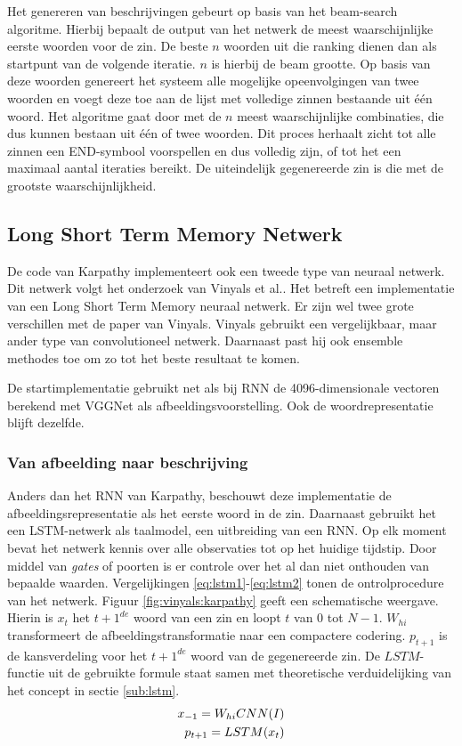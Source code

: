 Het genereren van beschrijvingen gebeurt op basis van het beam-search algoritme. Hierbij bepaalt de output van het netwerk de meest waarschijnlijke eerste woorden voor de zin. De beste $n$ woorden uit die ranking dienen dan als startpunt van de volgende iteratie. $n$ is hierbij de beam grootte. Op basis van deze woorden genereert het systeem alle mogelijke opeenvolgingen van twee woorden en voegt deze toe aan de lijst met volledige zinnen bestaande uit \'e\'en woord. Het algoritme gaat door met de $n$ meest waarschijnlijke combinaties, die dus kunnen bestaan uit \'e\'en of twee woorden. Dit proces herhaalt zicht tot alle zinnen een END-symbool voorspellen en dus volledig zijn, of tot het een maximaal aantal iteraties bereikt. De uiteindelijk gegenereerde zin is die met de grootste waarschijnlijkheid.

\subsection{Long Short Term Memory Netwerk}
\label{sec:lstm}
De code van Karpathy implementeert ook een tweede type van neuraal netwerk. Dit netwerk volgt het onderzoek van Vinyals et al.\cite{Google}. Het betreft een implementatie van een Long Short Term Memory neuraal netwerk. Er zijn wel twee grote verschillen met de paper van Vinyals. Vinyals gebruikt een vergelijkbaar, maar ander type van convolutioneel netwerk. Daarnaast past hij ook ensemble methodes toe om zo tot het beste resultaat te komen.

De startimplementatie gebruikt net als bij RNN de 4096-dimensionale vectoren berekend met VGGNet als afbeeldingsvoorstelling. Ook de woordrepresentatie blijft dezelfde.

\subsubsection{Van afbeelding naar beschrijving}
Anders dan het RNN van Karpathy, beschouwt deze implementatie de afbeeldingsrepresentatie als het eerste woord in de zin. Daarnaast gebruikt het een LSTM-netwerk als taalmodel, een uitbreiding van een RNN. Op elk moment bevat het netwerk kennis over alle observaties tot op het huidige tijdstip. Door middel van \emph{gates} of poorten is er controle over het al dan niet onthouden van bepaalde waarden. Vergelijkingen \eqref{eq:lstm1}-\eqref{eq:lstm2} tonen de ontrolprocedure van het netwerk. Figuur \ref{fig:vinyals:karpathy} geeft een schematische weergave. Hierin is $x_t$ het $t+1^{de}$ woord van een zin en loopt $t$ van $0$ tot $N-1$. $W_{hi}$ transformeert de afbeeldingstransformatie naar een compactere codering. $p_{t+1}$ is de kansverdeling voor het $t+1^{de}$ woord van de gegenereerde zin. De $LSTM$-functie uit de gebruikte formule staat samen met theoretische verduidelijking van het concept in sectie \ref{sub:lstm}. 
\begin{eqnarray}
\vspace{-3mm}
x_{-1} = W_{hi}CNN(I)\\
\label{eq:lstm1}
p_{t+1} = LSTM(x_t)
\label{eq:lstm2}
\end{eqnarray}

